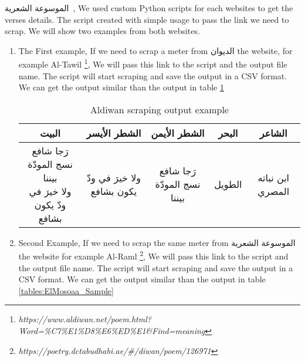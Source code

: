  \textarabic{الموسوعة الشعرية}~\cite{PoetryEncyclopedia2016}, We used custom Python scripts for each websites to get the verses details. The script created with simple usage to pass the link we need to scrap. We will show two examples from both websites.
\begin{enumerate}
\item The First example, If we need to scrap a meter from \textarabic{الديوان} the website, for example Al-Tawil \footnote{ \textit{https://www.aldiwan.net/poem.html?Word=\%C7\%E1\%D8\%E6\%ED\%E1\&Find=meaning}}, We will pass this link to the script and the output file name. The script will start scraping and save the output in a CSV format. We can get the output similar than the output in table \ref{tables:Aldiwan_Sample}


\begin{table}[H]
	\centering
	\begin{tabular}{c c c c c}
		\toprule
          \textbf{\small{\textarabic{البيت}}} & \small{\textbf{\textarabic{الشطر الأيسر}}} & \small{\textbf{\textarabic{الشطر الأيمن}}} &
\small{\textbf{\textarabic{البحر}}} & \small{\textbf{\textarabic{الشاعر}}} \\
          \midrule
\makecell{\textarabic{رَجا شافع نسج المودّة بيننا}\\ \textarabic{ولا خيرَ في ودّ يكون بشافع}} &
\textarabic{ولا خيرَ في ودّ يكون بشافع} &                                                       \textarabic{رَجا شافع نسج المودّة بيننا} &                                                       \textarabic{الطويل}&
\textarabic{ابن نباته المصري}\\
          
		\bottomrule
	\end{tabular}
	\caption{Aldiwan scraping output example }\label{tables:Aldiwan_Sample}
\end{table}

\item Second Example, If we need to scrap the same meter from \textarabic{الموسوعة الشعرية} the website for example Al-Raml \footnote{ \textit{https://poetry.dctabudhabi.ae/\#/diwan/poem/126971}}, We will pass this link to the script and the output file name. The script will start scraping and save the output in a CSV format. We can get the output similar than the output in table \ref{tables:ElMosoaa_Sample}



\end{enumerate}
